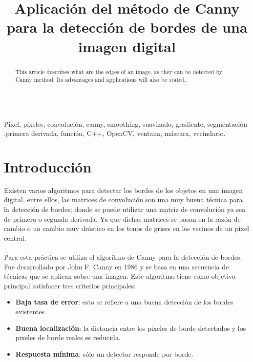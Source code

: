 \documentclass[conference]{IEEEtran}
\begin{document}
\title{ Aplicaci\'on del m\'etodo de Canny para la detecci\'on de bordes de una imagen digital }
\author{
}

\maketitle
\renewcommand\abstractname{Abstract}
\begin{abstract}
This article describes what are the edges of an image, as they can be detected by Canny method. Its advantages and applications will also be stated. \\\\
\end{abstract}

\begin{IEEEkeywords}
Pixel, p\'ixeles, convoluci\'on, canny, smoothing, suavizado, gradiente, segmentaci\'on ,primera derivada, funci\'on, C++, OpenCV, ventana, m\'ascara, vecindario.
\end{IEEEkeywords}

\IEEEpeerreviewmaketitle
\section{Introducci\'on}
Existen varios algoritmos para detectar los bordes de los objetos en una imagen digital, entre ellos, las matrices de convoluci\'on son una muy buena t\'ecnica para la detecci\'on de bordes; donde se puede utilizar una matriz de convoluci\'on ya sea de primera o segunda derivada. Ya que dichas matrices se basan en la raz\'on de cambio o un cambio muy dr\'astico en los tonos de grises en los vecinos de un pixel central. \\\\
Para esta pr\'actica se utiliza el algoritmo de Canny para la detecci\'on de bordes. Fue desarrollado por John F. Canny en 1986 y se basa en una secuencia de t\'ecnicas que se aplican sobre una imagen. Este algoritmo tiene como objetivo principal satisfacer tres criterios principales:\\
\begin{itemize}
	\item \textbf{Baja tasa de error}: esto se refiere a una buena detecci\'on de los bordes existentes.
	\item \textbf{Buena localizaci\'on}: la distancia entre los pixeles de borde detectados y los pixeles de borde reales es reducida.
	\item \textbf{Respuesta m\'inima}: s\'olo un detector responde por borde.\\
\end{itemize}
\end{document}
